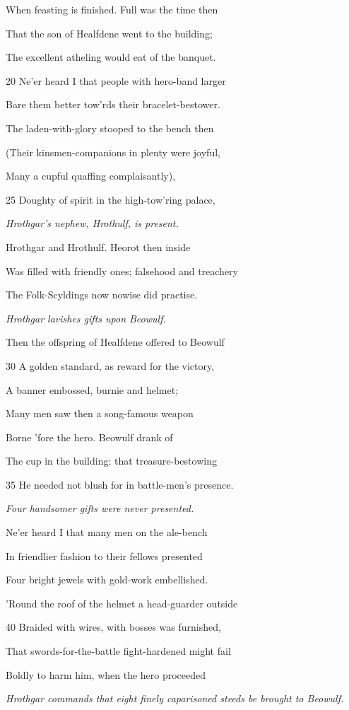 When feasting is finished. Full was the time then

That the son of Healfdene went to the building;

The excellent atheling would eat of the banquet.

20
Ne’er heard I that people with hero-band larger

Bare them better tow’rds their bracelet-bestower.

The laden-with-glory stooped to the bench then

(Their kinsmen-companions in plenty were joyful,

Many a cupful quaffing complaisantly),

25
Doughty of spirit in the high-tow’ring palace,

\emph{Hrothgar’s
nephew, Hrothulf,
is present.}

Hrothgar and Hrothulf. Heorot then inside

Was filled with friendly ones; falsehood and treachery

The Folk-Scyldings now nowise did practise.

\emph{Hrothgar lavishes
gifts upon Beowulf.}

Then the offspring of Healfdene offered to Beowulf

30
A golden standard, as reward for the victory,

A banner embossed, burnie and helmet;

Many men saw then a song-famous weapon

Borne ’fore the hero. Beowulf drank of

The cup in the building; that treasure-bestowing

35
He needed not blush for in battle-men’s presence.

\emph{Four handsomer
gifts were never
presented.}

Ne’er heard I that many men on the ale-bench

In friendlier fashion to their fellows presented

Four bright jewels with gold-work embellished.

’Round the roof of the helmet a head-guarder outside

40
Braided with wires, with bosses was furnished,

That swords-for-the-battle fight-hardened might fail

Boldly to harm him, when the hero proceeded

\emph{Hrothgar commands
that eight
finely caparisoned
steeds be brought
to Beowulf.}

